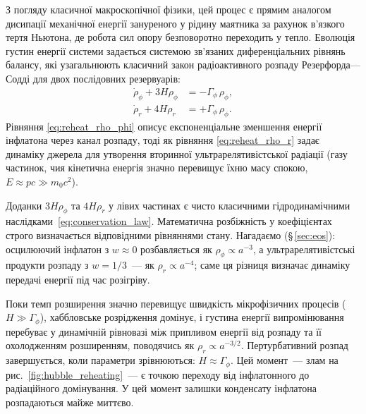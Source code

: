 З погляду класичної макроскопічної фізики, цей процес є прямим аналогом дисипації механічної енергії зануреного у рідину маятника за рахунок в'язкого тертя Ньютона, де робота сил опору безповоротно переходить у тепло. Еволюція густин енергії системи задається системою зв'язаних диференціальних рівнянь балансу, які узагальнюють класичний закон радіоактивного розпаду Резерфорда---Содді для двох послідовних резервуарів:
\begin{align}
  \dot{\rho}_\phi + 3H\rho_\phi
    &= -\Gamma_\phi\,\rho_\phi,
    \label{eq:reheat_rho_phi} \\
  \dot{\rho}_r + 4H\rho_r
    &= +\Gamma_\phi\,\rho_\phi.
    \label{eq:reheat_rho_r}
\end{align}
Рівняння \eqref{eq:reheat_rho_phi} описує експоненціальне зменшення енергії інфлатона через канал розпаду, тоді як рівняння \eqref{eq:reheat_rho_r} задає динаміку джерела для утворення вторинної ультрарелятивістської радіації (газу частинок, чия кінетична енергія значно перевищує їхню масу спокою, $E \approx pc \gg m_0 c^2$).

Доданки $3H\rho_\phi$ та $4H\rho_r$ у лівих частинах є чисто класичними гідродинамічними наслідками~\eqref{eq:conservation_law}. Математична розбіжність у коефіцієнтах строго визначається відповідними рівняннями стану. Нагадаємо (§\,\ref{sec:eos}): осцилюючий інфлатон з $w \approx 0$ розбавляється як $\rho_\phi \propto a^{-3}$, а ультрарелятивістські
продукти розпаду з $w = 1/3$~--- як $\rho_r \propto a^{-4}$;
саме ця різниця визначає динаміку передачі енергії під час розігріву.

Поки темп розширення значно перевищує швидкість мікрофізичних процесів ($H \gg \Gamma_\phi$), хаббловське розрідження домінує, і густина енергії випромінювання перебуває у динамічній рівновазі між припливом енергії від розпаду та її охолодженням розширенням, поводячись як $\rho_r \propto a^{-3/2}$. Пертурбативний розпад завершується, коли параметри зрівнюються: $H \approx \Gamma_\phi$. Цей момент~--- злам на рис.~\ref{fig:hubble_reheating}~--- є точкою переходу від інфлатонного до радіаційного домінування. У цей момент залишки конденсату інфлатона розпадаються майже миттєво.


